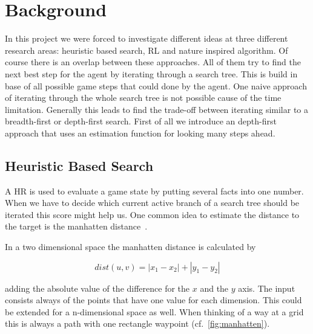 

\section{Background} 
\label{sec:back}

In this project we were forced to investigate different ideas at three different research areas: heuristic based search, \ac{RL} and nature inspired algorithm. 
Of course there is an overlap between these approaches. All of them try to find the next best step for the agent by iterating through a search tree. This is build in base of all possible game steps that could done by the agent.
One naive approach of iterating through the whole search tree is not possible cause of the time limitation.
Generally this leads to find the trade-off between iterating similar to a breadth-first or depth-first search.
First of all we introduce an depth-first approach that uses an estimation function for looking many steps ahead.


\subsection{Heuristic Based Search} 

A \ac{HR} is used to evaluate a game state by putting several facts into one number. When we have to decide which current active branch of a search tree should be iterated this score might help us. 
One common idea to estimate the distance to the target is the manhatten distance~\cite{distance_metrics}. 

In a two dimensional space the manhatten distance is calculated by

\begin{equation}
dist(u,v) = |x_{1} - x_{2}| + |y_{1} - y_{2}|
\end{equation}

adding the absolute value of the difference for the $x$ and the $y$ axis. The input consists always of the points that have one value for each dimension. This could be extended for a n-dimensional space as well. When thinking of a way at a grid this is always a path with one rectangle waypoint (cf.~\cref{fig:manhatten}).

